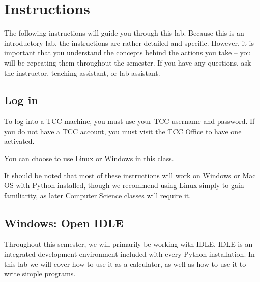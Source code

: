 \documentclass[12pt,hidelinks]{article}
\begin{document}

\pagebreak
\section{Instructions}

The following instructions will guide you through this lab. Because this is an
introductory lab, the instructions are rather detailed and specific. However, it
is important that you understand the concepts behind the actions you take -- you
will be repeating them throughout the semester. If you have any questions, ask
the instructor, teaching assistant, or lab assistant.

\subsection{Log in}
To log into a TCC machine, you must use your TCC username and password. If you
do not have a TCC account, you must visit the TCC Office to have one activated.

You can choose to use Linux or Windows in this class.

It should be noted that most of these instructions will work on Windows or Mac
OS with Python installed, though we recommend using Linux simply to gain
familiarity, as later Computer Science classes will require it.

\subsection{Windows: Open IDLE}
Throughout this semester, we will primarily be working with IDLE. IDLE is an
integrated development environment included with every Python installation. In
this lab we will cover how to use it as a calculator, as well as how to use it
to write simple programs.
\end{document}
